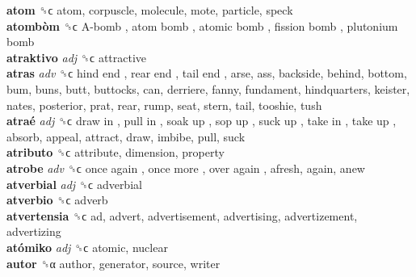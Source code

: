 \textbf{atom} ␝ϲ  atom, corpuscle, molecule, mote, particle, speck  \\
\textbf{atombòm} ␝ϲ   A-bomb ,  atom bomb ,  atomic bomb ,  fission bomb ,  plutonium bomb   \\
\textbf{atraktivo} \emph{adj}  ␝ϲ  attractive  \\
\textbf{atras} \emph{adv}  ␝ϲ   hind end ,  rear end ,  tail end , arse, ass, backside, behind, bottom, bum, buns, butt, buttocks, can, derriere, fanny, fundament, hindquarters, keister, nates, posterior, prat, rear, rump, seat, stern, tail, tooshie, tush  \\
\textbf{atraé} \emph{adj}  ␝ϲ   draw in ,  pull in ,  soak up ,  sop up ,  suck up ,  take in ,  take up , absorb, appeal, attract, draw, imbibe, pull, suck  \\
\textbf{atributo} ␝ϲ  attribute, dimension, property  \\
\textbf{atrobe} \emph{adv}  ␝ϲ   once again ,  once more ,  over again , afresh, again, anew  \\
\textbf{atverbial} \emph{adj}  ␝ϲ  adverbial  \\
\textbf{atverbio} ␝ϲ  adverb  \\
\textbf{atvertensia} ␝ϲ  ad, advert, advertisement, advertising, advertizement, advertizing  \\
\textbf{atómiko} \emph{adj}  ␝ϲ  atomic, nuclear  \\
\textbf{autor} ␝α  author, generator, source, writer  \\
